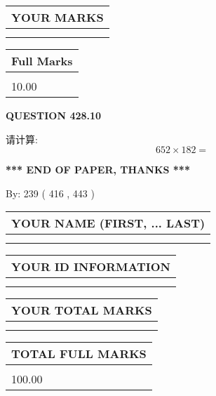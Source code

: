 \documentclass{ctexart}
\begin{document}
 
  
\vspace{0.2in}
  
\noindent\begin{tabular}{|l|}
\hline
 YOUR MARKS  \\
\hline
 \\ 
 \\ 
\hline
\end{tabular}
\hspace{0.05in} \begin{tabular}{|l|}
\hline
 Full Marks  \\
\hline
 \\ 
10.00 \\
\hline
\end{tabular}
{\textbf{\Large{QUESTION
428.10 
}}}
  
  
 
请计算:
\begin{equation}
652  \times    %
182 = \nonumber
\end{equation}
 

 

 
   
   
 \vspace{0.2in}
 
   
   
   
   
\vspace{1.0in} 
{\textbf{\large{ *** END OF PAPER, THANKS *** }}} 
   
   
\hspace{1.0in} By: 
 239 ( 416 ,  443 )
   
   
   
   
\newpage 
\setcounter{page}{ 
   429001 } 
   
   
   
   
\noindent\begin{tabular}{|l|}
\hline
YOUR NAME (FIRST, ... LAST)  \\
\hline
 \\ 
 \\ 
\hline
\end{tabular}
\hspace{0.05in} \begin{tabular}{|l|}
\hline
 YOUR   ID   INFORMATION  \\
\hline
 \\ 
 \\ 
\hline
\end{tabular}
   
   
\vspace{0.2in}\noindent\begin{tabular}{|l|}
\hline
YOUR TOTAL MARKS  \\
\hline
 \\ 
 \\ 
\hline
\end{tabular}
\hspace{0.05in} \begin{tabular}{|l|}
\hline
TOTAL FULL MARKS  \\
\hline
 \\ 
100.00 \\
\hline
\end{tabular}
   
\end{document}
